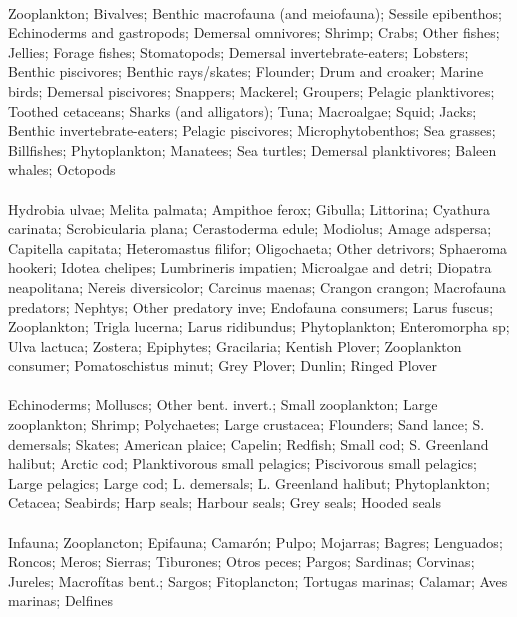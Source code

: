 \fullhline
\hline
{} \\
\hline
Zooplankton; Bivalves; Benthic macrofauna (and meiofauna); Sessile epibenthos; Echinoderms and gastropods; Demersal omnivores; Shrimp; Crabs; Other fishes; Jellies; Forage fishes; Stomatopods; Demersal invertebrate-eaters; Lobsters; Benthic piscivores; Benthic rays/skates; Flounder; Drum and croaker; Marine birds; Demersal piscivores; Snappers; Mackerel; Groupers; Pelagic planktivores; Toothed cetaceans; Sharks  (and alligators); Tuna; Macroalgae; Squid; Jacks; Benthic invertebrate-eaters; Pelagic piscivores; Microphytobenthos; Sea grasses; Billfishes; Phytoplankton; Manatees; Sea turtles; Demersal planktivores; Baleen whales; Octopods\\
\fullhline
\hline
{} \\
\hline
Hydrobia ulvae; Melita palmata; Ampithoe ferox; Gibulla; Littorina; Cyathura carinata; Scrobicularia plana; Cerastoderma edule; Modiolus; Amage adspersa; Capitella capitata; Heteromastus filifor; Oligochaeta; Other detrivors; Sphaeroma hookeri; Idotea chelipes; Lumbrineris impatien; Microalgae and detri; Diopatra neapolitana; Nereis diversicolor; Carcinus maenas; Crangon crangon; Macrofauna predators; Nephtys; Other predatory inve; Endofauna consumers; Larus fuscus; Zooplankton; Trigla lucerna; Larus ridibundus; Phytoplankton; Enteromorpha sp; Ulva lactuca; Zostera; Epiphytes; Gracilaria; Kentish Plover; Zooplankton consumer; Pomatoschistus minut; Grey Plover; Dunlin; Ringed Plover\\
\fullhline
\hline
{} \\
\hline
Echinoderms; Molluscs; Other bent. invert.; Small zooplankton; Large zooplankton; Shrimp; Polychaetes; Large crustacea; Flounders; Sand lance; S. demersals; Skates; American plaice; Capelin; Redfish; Small cod; S. Greenland halibut; Arctic cod; Planktivorous small pelagics; Piscivorous small pelagics; Large pelagics; Large cod; L. demersals; L. Greenland halibut; Phytoplankton; Cetacea; Seabirds; Harp seals; Harbour seals; Grey seals; Hooded seals\\
\fullhline
\hline
{} \\
\hline
Infauna; Zooplancton; Epifauna; Camarón; Pulpo; Mojarras; Bagres; Lenguados; Roncos; Meros; Sierras; Tiburones; Otros peces; Pargos; Sardinas; Corvinas; Jureles; Macrofítas bent.; Sargos; Fitoplancton; Tortugas marinas; Calamar; Aves marinas; Delfines\\
